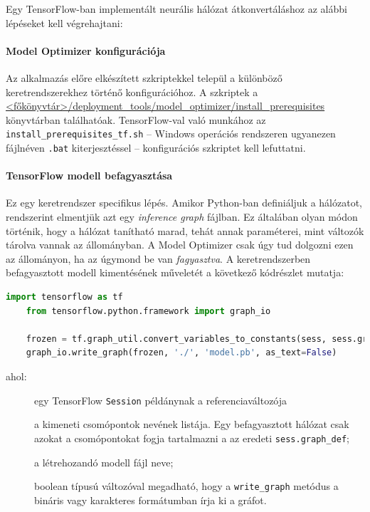 Egy TensorFlow-ban implementált neurális hálózat átkonvertáláshoz az alábbi lépéseket kell végrehajtani:
\paragraph*{Model Optimizer konfigurációja}
	Az alkalmazás előre elkészített szkriptekkel települ a különböző keretrendszerekhez történő konfigurációhoz. A szkriptek a \url{<főkönyvtár>/deployment_tools/model_optimizer/install_prerequisites} könyvtárban találhatóak. TensorFlow-val való munkához az \verb|install_prerequisites_tf.sh| -- Windows operációs rendszeren ugyanezen fájlnéven \verb|.bat| kiterjesztéssel -- konfigurációs szkriptet kell lefuttatni.

\paragraph*{TensorFlow modell befagyasztása}
	Ez egy keretrendszer specifikus lépés. Amikor Python-ban definiáljuk a hálózatot, rendszerint elmentjük azt egy \emph{inference graph} fájlban. Ez általában olyan módon történik, hogy a hálózat tanítható marad, tehát annak paraméterei, mint változók tárolva vannak az állományban. A Model Optimizer csak úgy tud dolgozni ezen az állományon, ha az úgymond be van \emph{fagyasztva}. A keretrendszerben befagyasztott modell kimentésének műveletét a következő kódrészlet mutatja:
	\begin{lstlisting}[language=Python]
	import tensorflow as tf
	from tensorflow.python.framework import graph_io
	
	frozen = tf.graph_util.convert_variables_to_constants(sess, sess.graph_def, ["output_node"])
	graph_io.write_graph(frozen, './', 'model.pb', as_text=False)
	\end{lstlisting}
	ahol:
	\begin{description}
		\item[] egy TensorFlow \verb|Session| példánynak a referenciaváltozója
		\item[] a kimeneti csomópontok nevének listája. Egy befagyasztott hálózat csak azokat a csomópontokat fogja tartalmazni a az eredeti \verb|sess.graph_def|;
		\item[] a létrehozandó modell fájl neve;
		\item[] boolean típusú változóval megadható, hogy a \verb|write_graph| metódus a bináris vagy karakteres formátumban írja ki a gráfot.
	\end{description}

